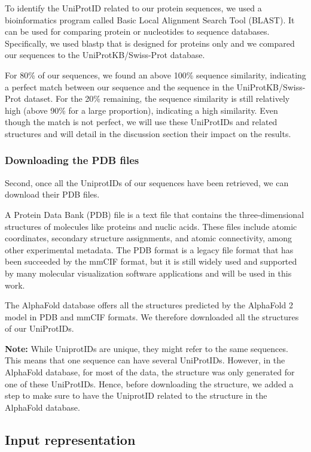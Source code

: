 To identify the UniProtID related to our protein sequences, we used a bioinformatics program called 
Basic Local Alignment Search Tool (BLAST). It can be used for comparing protein or nucleotides to sequence databases.
Specifically, we used blastp that is designed for proteins only and we compared our sequences to the 
UniProtKB/Swiss-Prot database. 

For 80\% of our sequences, we found an above 100\% sequence similarity, indicating a perfect match between our
sequence and the sequence in the UniProtKB/Swiss-Prot dataset. For the 20\% remaining, the sequence similarity is
still relatively high (above 90\% for a large proportion), indicating a high similarity. Even though the match is
not perfect, we will use these UniProtIDs and related structures and will detail in the discussion section their
impact on the results.

\subsubsection{Downloading the PDB files}

Second, once all the UniprotIDs of our sequences have been retrieved, we can download their PDB files.

A Protein Data Bank (PDB) file is a text file that contains the three-dimensional structures of molecules like
proteins and nuclic acids. These files include atomic coordinates, secondary structure assignments, 
and atomic connectivity, among other experimental metadata. The PDB format is a legacy file format that 
has been succeeded by the mmCIF format, but it is still widely used and supported by many molecular 
visualization software applications and will be used in this work.

The AlphaFold database offers all the structures predicted by the AlphaFold 2 model in PDB and mmCIF formats. 
We therefore downloaded all the structures of our UniProtIDs. 

\textbf{Note:} While UniprotIDs are unique, they might refer to the same sequences. This means that one sequence can have
several UniProtIDs. However, in the AlphaFold database, for most of the data, the structure was only generated 
for one of these UniProtIDs. Hence, before downloading the structure, we added a step to make sure to have 
the UniprotID related to the structure in the AlphaFold database.

\subsection{Input representation}

